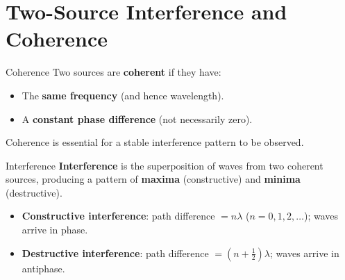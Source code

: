 

\section{Two-Source Interference and Coherence}

\begin{definitionbox}{Coherence}
Two sources are \textbf{coherent} if they have:
\begin{itemize}[itemsep=2pt]
  \item The \textbf{same frequency} (and hence wavelength).
  \item A \textbf{constant phase difference} (not necessarily zero).
\end{itemize}
Coherence is essential for a stable interference pattern to be observed.
\end{definitionbox}

\begin{definitionbox}{Interference}
\textbf{Interference} is the superposition of waves from two coherent sources, producing a pattern of \textbf{maxima} (constructive) and \textbf{minima} (destructive).
\begin{itemize}[itemsep=2pt]
  \item \textbf{Constructive interference}: path difference $= n\lambda$ ($n = 0, 1, 2, \ldots$); waves arrive in phase.
  \item \textbf{Destructive interference}: path difference $= (n + \tfrac{1}{2})\lambda$; waves arrive in antiphase.
\end{itemize}
\end{definitionbox}

